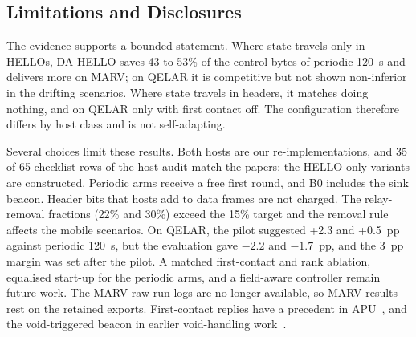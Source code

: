 \subsection{Limitations and Disclosures}
\label{sec:limits}
The evidence supports a bounded statement. Where state travels only in HELLOs, DA-HELLO saves 43 to 53\% of the control bytes of periodic 120~s and delivers more on MARV; on QELAR it is competitive but not shown non-inferior in the drifting scenarios. Where state travels in headers, it matches doing nothing, and on QELAR only with first contact off. The configuration therefore differs by host class and is not self-adapting.

Several choices limit these results. Both hosts are our re-implementations, and 35 of 65 checklist rows of the host audit match the papers; the HELLO-only variants are constructed. Periodic arms receive a free first round, and B0 includes the sink beacon. Header bits that hosts add to data frames are not charged. The relay-removal fractions (22\% and 30\%) exceed the 15\% target and the removal rule affects the mobile scenarios. On QELAR, the pilot suggested +2.3 and +0.5~pp against periodic 120~s, but the evaluation gave $-2.2$ and $-1.7$~pp, and the 3~pp margin was set after the pilot. A matched first-contact and rank ablation, equalised start-up for the periodic arms, and a field-aware controller remain future work. The MARV raw run logs are no longer available, so MARV results rest on the retained exports. First-contact replies have a precedent in APU~\cite{chen2013apu}, and the void-triggered beacon in earlier void-handling work~\cite{ghoreyshi2017void}.
